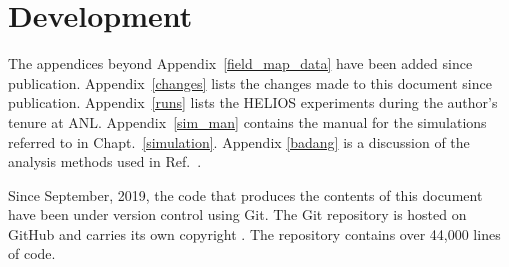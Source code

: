 \section{Development}
The appendices beyond Appendix~\ref{field_map_data} have been added since publication.
Appendix~\ref{changes} lists the changes made to this document since publication.
Appendix~\ref{runs} lists the HELIOS experiments during the author's tenure at ANL.
Appendix~\ref{sim_man} contains the manual for the simulations referred to in Chapt.~\ref{simulation}.
Appendix \ref{badang} is a discussion of the analysis methods used in Ref.~\cite{Schiffer_2010}.

Since September, 2019, the code that produces the contents of this document have been under version control using Git. The Git repository is hosted on GitHub and carries its own copyright \cite{Lighthall_thesis_2021}. The repository contains over 44,000 lines of code.

